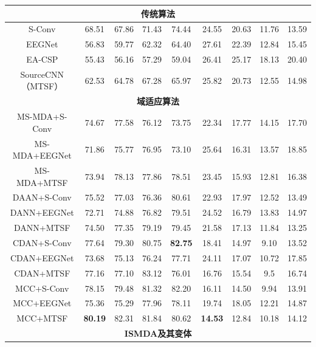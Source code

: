 \begin{table}[!t]
{\begin{threeparttable}
{\begin{tabular}{ccccccccc}
        \midrule
        \multicolumn{9}{c}{\textbf{传统算法}}\\                  
        \midrule
        S-Conv              & 68.51 & 	67.86 & 71.43 & 74.44 & 24.55 & 20.63 & 11.76 & 13.59 \\
        EEGNet                     & 56.83 & 	59.77 & 62.32 & 64.40 & 27.61 & 22.39 & 12.84 & 15.45 \\
        EA-CSP                     & 55.43 & 	56.16 & 57.29 & 59.04 & 26.41 & 25.17 & 18.13 & 20.40 \\
        SourceCNN（MTSF）           & 62.53 & 	64.78 & 67.28 & 65.97 & 25.82 & 20.73 & 12.55 & 14.98 \\
        \midrule
        \multicolumn{9}{c}{\textbf{域适应算法}}\\ 
        \midrule
        MS-MDA+S-Conv   & 74.67 & 	77.58 & 76.12 & 73.75 & 22.34 & 17.77 & 14.15 & 17.70 \\
        MS-MDA+EEGNet           & 71.86 & 	75.77 & 76.95 & 73.10 & 25.64 & 16.31 & 13.57 & 18.85 \\
        MS-MDA+MTSF & 73.94 & 	78.13 & 77.86 & 78.51 & 23.45 & 15.93 & 12.81 & 16.38 \\
        DAAN+S-Conv       & 75.52 & 	77.03 & 76.36 & 80.61 & 22.93 & 17.97 & 12.52 & 13.49 \\
        DANN+EEGNet                   & 72.71 & 	74.88 & 76.82 & 79.51 & 24.52 & 16.79 & 13.83 & 14.97 \\
        DANN+MTSF         & 74.50 & 	77.35 & 79.19 & 79.45 & 21.58 & 17.13 & 11.84 & 13.25 \\
        CDAN+S-Conv           & 77.64 & 	79.30 & 80.75 & \textbf{82.75}  & 18.41 & 14.97 & 9.10  & 13.52 \\
        CDAN+EEGNet                   & 73.68 & 	75.13 & 76.24 & 77.71 & 24.11 & 17.07 & 10.72 & 17.85 \\
        CDAN+MTSF         & 77.16 & 	77.10 & 83.12 & 76.01 & 16.76 & 15.54 & 9.5   & 16.74 \\
        MCC+S-Conv      & 78.15 & 	79.48 & 81.32 & 82.20  & 16.11 & 14.50 & 9.94  & 13.91 \\
        MCC+EEGNet              & 75.36 & 	75.29 & 77.96 & 78.11 & 19.74 & 18.05 & 12.21 & 14.87 \\
        MCC+MTSF    & \textbf{80.19} & 	82.31 & 81.84 & 80.62 & \textbf{14.53} & 12.84 & 10.18   & 14.12 \\
        \midrule
        \multicolumn{9}{c}{\textbf{ISMDA及其变体}}\\ 

\end{tabular}}
\end{threeparttable}}
\end{table}
